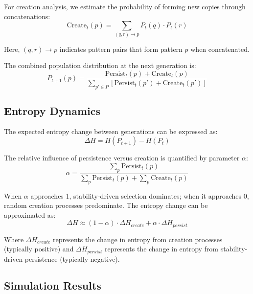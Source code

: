 \documentclass[preprint,12pt]{elsarticle}
\begin{document}
For creation analysis, we estimate the probability of forming new copies through concatenations:
\begin{equation}
\label{eq:create-term}
\mathrm{Create}_t(p) = \sum_{(q,r) \to p} P_t(q) \cdot P_t(r)
\end{equation}

Here, \((q,r) \to p\) indicates pattern pairs that form pattern \(p\) when concatenated.

The combined population distribution at the next generation is:
\begin{equation}
\label{eq:full-ba-update}
P_{t+1}(p) = \frac{
  \mathrm{Persist}_t(p) + \mathrm{Create}_t(p)
}{
  \sum_{p' \in P} 
  \left[
    \mathrm{Persist}_t(p') + \mathrm{Create}_t(p')
  \right]
}
\end{equation}

\subsection{Entropy Dynamics}

The expected entropy change between generations can be expressed as:
\begin{equation}
\Delta H = H(P_{t+1}) - H(P_t)
\end{equation}

The relative influence of persistence versus creation is quantified by parameter $\alpha$:
\begin{equation}
\alpha = \frac{\sum_p \mathrm{Persist}_t(p)}{\sum_p \mathrm{Persist}_t(p) + \sum_p \mathrm{Create}_t(p)}
\end{equation}

When $\alpha$ approaches 1, stability-driven selection dominates; when it approaches 0, random creation processes predominate. The entropy change can be approximated as:
\begin{equation}
\Delta H \approx (1 - \alpha) \cdot \Delta H_{create} + \alpha \cdot \Delta H_{persist}
\end{equation}

Where $\Delta H_{create}$ represents the change in entropy from creation processes (typically positive) and $\Delta H_{persist}$ represents the change in entropy from stability-driven persistence (typically negative).

\subsection{Simulation Results}
\end{document}
